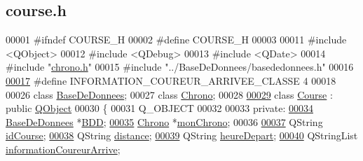 \hypertarget{course_8h_source}{}\subsection{course.\+h}
\label{course_8h_source}

\begin{DoxyCode}
00001 \textcolor{preprocessor}{#ifndef COURSE\_H}
00002 \textcolor{preprocessor}{#define COURSE\_H}
00003 
00011 \textcolor{preprocessor}{#include <QObject>}
00012 \textcolor{preprocessor}{#include <QDebug>}
00013 \textcolor{preprocessor}{#include <QDate>}
00014 \textcolor{preprocessor}{#include "\hyperlink{chrono_8h}{chrono.h}"}
00015 \textcolor{preprocessor}{#include "../BaseDeDonnees/basededonnees.h"}
00016 
\hyperlink{course_8h_a2d7a26b028c89e758ebca4fe8455b861}{00017} \textcolor{preprocessor}{#define INFORMATION\_COUREUR\_ARRIVEE\_CLASSE 4}
00018 
00026 \textcolor{keyword}{class }\hyperlink{class_base_de_donnees}{BaseDeDonnees};
00027 \textcolor{keyword}{class }\hyperlink{class_chrono}{Chrono};
00028 
\hyperlink{class_course}{00029} \textcolor{keyword}{class }\hyperlink{class_course}{Course} : \textcolor{keyword}{public} \hyperlink{class_q_object}{QObject}
00030 \{
00031     Q\_OBJECT
00032 
00033 \textcolor{keyword}{private}:
\hyperlink{class_course_a28a58b06494361b7a7eb81844d571dd4}{00034}     \hyperlink{class_base_de_donnees}{BaseDeDonnees} *\hyperlink{class_course_a28a58b06494361b7a7eb81844d571dd4}{BDD}; 
\hyperlink{class_course_a0c9b246b0f1ec612bd6e6c613a94d52b}{00035}     \hyperlink{class_chrono}{Chrono} *\hyperlink{class_course_a0c9b246b0f1ec612bd6e6c613a94d52b}{monChrono}; 
00036 
\hyperlink{class_course_a1f80798e50be6db9911a882a2491c698}{00037}     QString \hyperlink{class_course_a1f80798e50be6db9911a882a2491c698}{idCourse}; 
\hyperlink{class_course_af2f7b814a0ec0d76291a2743c61615a8}{00038}     QString \hyperlink{class_course_af2f7b814a0ec0d76291a2743c61615a8}{distance}; 
\hyperlink{class_course_aa2da10dd2fc8c1ca1d5831249181e61f}{00039}     QString \hyperlink{class_course_aa2da10dd2fc8c1ca1d5831249181e61f}{heureDepart}; 
\hyperlink{class_course_a14838cc0c491a76baf7e5f12d8d08ab4}{00040}     QStringList \hyperlink{class_course_a14838cc0c491a76baf7e5f12d8d08ab4}{informationCoureurArrive}; 

\end{DoxyCode}
